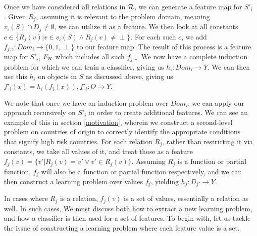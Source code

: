 \documentclass[twoside,11pt]{article}
\theoremstyle{definition}
\begin{document}
Once we have considered all relations in ${\cal R}$, we can generate a feature map for $S'_i$. Given $R_j$, assuming it is relevant to the problem domain, meaning $v_i(S)\cap D_j\neq\emptyset$, we can utilize it as a feature. We then look at all constants $c\in \{R_j(v)|v\in v_i(S)\land R_j(v)\neq \perp\}$. For each such $c$, we add $f_{j,c}:Dom_i\rightarrow \{0,1,\perp\}$ to our feature map. The result of this process is a feature map for $S'_i$, $F_{\cal R}$ which includes all such $f_{j,c}$. We now have a complete induction problem for which we can train a classifier, giving us $h_i:Dom_i\rightarrow Y$. We can then use this $h_i$ on objects in $S$ as discussed above, giving us $f'_{i}(x)=h_{i}(f_{i}(x)), f'_{i}:O\rightarrow Y$. 

We note that once we have an induction problem over $Dom_i$, we can apply our approach recursively on $S'_i$ in order to create additional features. We can see an example of this in section \ref{motivation}, wherein we construct a second-level problem on countries of origin to correctly identify the appropriate conditions that signify high risk countries.
 For each relation $R_j$, rather than restricting it via constants, we take all values of it, and treat those as a feature $f_j(v)=\{v'|R_j(v)=v' \lor v'\in R_j(v) \}$. Assuming $R_j$ is a function or partial function, $f_j$ will also be a function or partial function respectively, and we can then construct a learning problem over values $f_j$, yielding $h_j:D_{j'}\rightarrow Y$. 
 
 In cases where $R_j$ is a relation, $f_j(v)$ is a set of values, essentially a relation as well. In such cases, We must discuss both how to extract a new learning problem, and how a classifier is then used for a set of features.
 To begin with, let us tackle the issue of constructing a learning problem where each feature value is a set. %
\end{document}
